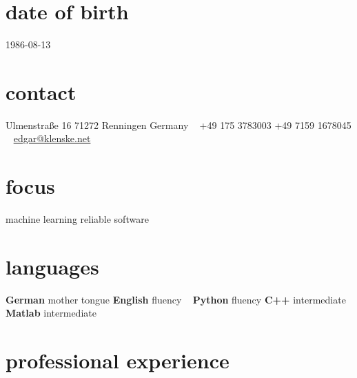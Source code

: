 \documentclass[a4paper]{k-cv} %
\begin{document}


\begin{aside} %
  \section{date of birth}
  \color{gray}1986-08-13
  \section{contact}
  \color{headercolor}Ulmenstraße 16
  71272 Renningen
  Germany
  ~
  +49 175 3783003
  +49 7159 1678045
  ~
  \href{mailto:edgar@klenske.net}{edgar@klenske.net}
  \section{focus}
  machine learning
  reliable software
  \section{languages}
   {\bfseries German} mother tongue
    {\bfseries English} fluency
  ~
  {\bfseries Python} fluency
    {\bfseries C++} intermediate
    {\bfseries Matlab} intermediate
\end{aside}


\section{professional experience}
\end{document}
